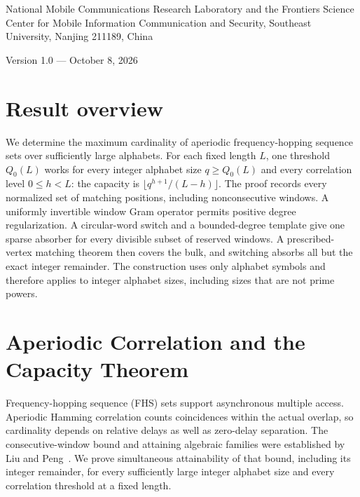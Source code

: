 \documentclass[12pt,letterpaper,onecolumn]{article}
\theoremstyle{definition}
\begin{document}
\par\medskip
{}\medskip
{}\par\smallskip
\noindent\begin{minipage}{\linewidth}\small National Mobile Communications Research Laboratory and the Frontiers Science Center for Mobile Information Communication and Security, Southeast University, Nanjing 211189, China\end{minipage}\par\medskip
\noindent Version 1.0 --- October 8, 2026\par\bigskip
{}
\section*{Result overview}
We determine the maximum cardinality of aperiodic frequency-hopping sequence sets over sufficiently large alphabets. For each fixed length $L$, one threshold $Q_0(L)$ works for every integer alphabet size $q\ge Q_0(L)$ and every correlation level $0\le h<L$: the capacity is $\lfloor q^{h+1}/(L-h)\rfloor$. The proof records every normalized set of matching positions, including nonconsecutive windows. A uniformly invertible window Gram operator permits positive degree regularization. A circular-word switch and a bounded-degree template give one sparse absorber for every divisible subset of reserved windows. A prescribed-vertex matching theorem then covers the bulk, and switching absorbs all but the exact integer remainder. The construction uses only alphabet symbols and therefore applies to integer alphabet sizes, including sizes that are not prime powers.
\section{Aperiodic Correlation and the Capacity Theorem}
Frequency-hopping sequence (FHS) sets support asynchronous multiple access. Aperiodic Hamming correlation counts coincidences within the actual overlap, so cardinality depends on relative delays as well as zero-delay separation. The consecutive-window bound and attaining algebraic families were established by Liu and Peng~\cite{liu2014}. We prove simultaneous attainability of that bound, including its integer remainder, for every sufficiently large integer alphabet size and every correlation threshold at a fixed length.
\end{document}
